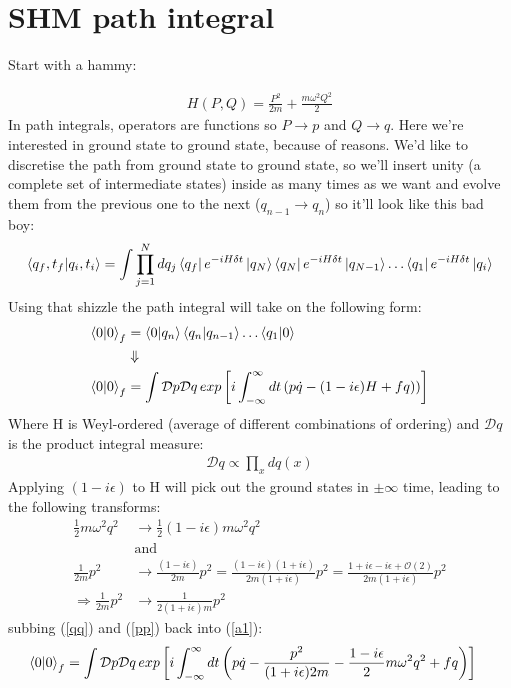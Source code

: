\documentclass[10pt]{article}
\begin{document}
\section*{SHM path integral}%
\label{sec:shm_path_integral}

Start with a hammy:

\begin{align}
	H \left(P,Q\right) = \frac{P^2}{2m} + \frac{m\omega^2Q^2}{2}
\end{align}
In path integrals, operators are functions so $P \rightarrow p$ and $Q \rightarrow q$. Here we're interested in ground state to ground state, because of reasons. We'd like to discretise the path from ground state to ground state, so we'll insert unity (a complete set of intermediate states) inside as many times as we want and evolve them from the previous one to the next ($q_{n-1} \to q_{n}$) so it'll look like this bad boy:
\begin{align}
\braket{q_f,t_f}{q_i,t_i} = \int \prod_{j=1}^N dq_j \bra{q_f}e^{-iH\delta t}\ket{q_N}\bra{q_N}e^{-iH\delta t}\ket{q_{N-1}} \ldots \bra{q_1}e^{-iH\delta t}\ket{q_i}
\end{align}
Using that shizzle the path integral will take on the following form:
\begin{align}
	\braket{0}{0}_f &= \braket{0}{q_n}\braket{q_{n}}{q_{n-1}}\ldots \braket{q_1}{0} \\
		      &\Downarrow \nonumber \\
	\braket{0}{0}_f &= \int \mathcal{D}p \mathcal{D}q \,exp \left[i \int_{-\infty}^{\infty}dt \left(p\dot{q} - \left(1-i\epsilon)H + fq \right)\right)\right] \label{a1}
\end{align}
Where H is Weyl-ordered (average of different combinations of ordering) and $\mathcal{D}q$ is the product integral measure:
\begin{align}
	\mathcal{D}q \propto \prod_x dq(x)
\end{align}
Applying $(1-i\epsilon)$ to H will pick out the ground states in $\pm\infty$ time, leading to the following transforms:
\begin{align}
	\frac{1}{2}m\omega^2q^2 &\rightarrow \frac{1}{2}(1-i\epsilon)m\omega^2q^2 \label{qq}\\
			      & \text{and} \nonumber \\
	\frac{1}{2m}p^2 &\rightarrow \frac{(1-i\epsilon)}{2m}p^2 = \frac{(1-i\epsilon)(1+i\epsilon)}{2m(1+i\epsilon)}p^2 = \frac{1+i\epsilon-i\epsilon+\mathcal{O}(2)}{2m(1+i\epsilon)}p^2 \nonumber\\
	\Rightarrow \frac{1}{2m}p^2 &\rightarrow \frac{1}{2(1+i\epsilon)m}p^2 \label{pp}
\end{align}
subbing (\ref{qq}) and (\ref{pp}) back into (\ref{a1}):
\begin{align}
	\braket{0}{0}_f &= \int \mathcal{D}p \mathcal{D}q \,exp \left[i \int_{-\infty}^{\infty}dt \left(p\dot{q} - \frac{p^2}{(1+i\epsilon)2m} - \frac{1-i\epsilon}{2} m\omega^2q^2 + fq \right)\right]
\end{align}
\end{document}
